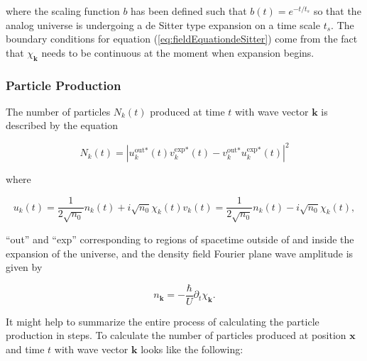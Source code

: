\documentclass{article}
\begin{document}
            where the scaling function $b$ has been defined such that $b(t) = e^{-t / t_s}$ so that the analog universe is undergoing a de Sitter type expansion on a time scale $t_s$.  The boundary conditions for equation (\ref{eq:fieldEquationdeSitter}) come from the fact that $\chi_\mathbf{k}$ needs to be continuous at the moment when expansion begins.

        \subsubsection{Particle Production} \label{sec:particleProduction}

            The number of particles $N_k(t)$ produced at time $t$ with wave vector $\mathbf{k}$ is described by the equation

            \begin{equation} \label{eq:particleProduction}
                N_k(t) = \left| u_k^{\text{out} *}(t) v_k^{\text{exp} *}(t) - v_k^{\text{out} *} u_k^{\text{exp} *}(t) \right|^2
            \end{equation}

            where

            \begin{subequations} \label{eq:mixedFourierAmplitudes}
            \begin{equation}
                u_k(t) = \frac{1}{2 \sqrt{n_0}} n_k(t) + i \sqrt{n_0} \chi_k(t)
            \end{equation}
            \begin{equation}
                v_k(t) = \frac{1}{2 \sqrt{n_0}} n_k(t) - i \sqrt{n_0} \chi_k(t),
            \end{equation}
            \end{subequations}

            ``out'' and ``exp'' corresponding to regions of spacetime outside of and inside the expansion of the universe, and the density field Fourier plane wave amplitude is given by 

            \begin{equation} \label{eq:densityFromPhase}
                n_\mathbf{k} = - \frac{\hbar}{U} \partial_t \chi_\mathbf{k}.
            \end{equation}

            It might help to summarize the entire process of calculating the particle production in steps. To calculate the number of particles produced at position $\mathbf{x}$ and time $t$ with wave vector $\mathbf{k}$ looks like the following:
\end{document}
